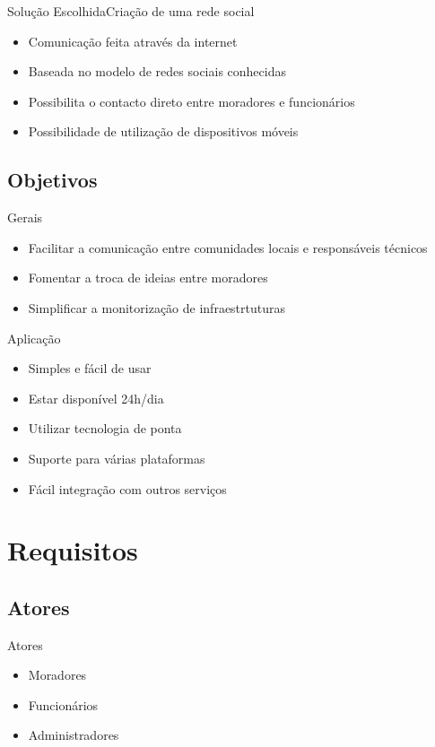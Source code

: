 \documentclass[portuges]{beamer}
\begin{document}
\begin{frame}{Solução Escolhida}{Criação de uma rede social}
  \begin{itemize}
  \item Comunicação feita através da internet
  \item Baseada no modelo de redes sociais conhecidas
  \item Possibilita o contacto direto entre moradores e funcionários
  \item Possibilidade de utilização de dispositivos móveis
  \end{itemize}
\end{frame}

\subsection{Objetivos}

\begin{frame}{Gerais}
 \begin{itemize}
 \item Facilitar a comunicação entre comunidades locais e responsáveis técnicos
 \item Fomentar a troca de ideias entre moradores
 \item Simplificar a monitorização de infraestrtuturas
 \end{itemize}
\end{frame}

\begin{frame}{Aplicação}
 \begin{itemize}
 \item Simples e fácil de usar
 \item Estar disponível 24h/dia
 \item Utilizar tecnologia de ponta
 \item Suporte para várias plataformas
 \item Fácil integração com outros serviços 
 \end{itemize}
\end{frame}

\section{Requisitos}

\subsection{Atores}

\begin{frame}{Atores}
 \begin{itemize}
 \item Moradores
 \item Funcionários
 \item Administradores
 \end{itemize}
\end{frame}
\end{document}
